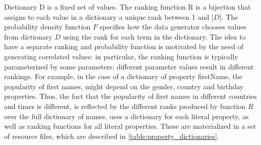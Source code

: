 Dictionary D is a fixed set of values. The ranking function R is a bijection
that assigns to each value in a dictionary a unique rank between 1 and |$D$|.
The probability density function $F$ specifies how the data generator chooses
values from dictionary $D$ using the rank for each term in the dictionary. The
idea to have a separate ranking and probability function is motivated by the
need of generating correlated values: in particular, the ranking function is
typically parameterized by some parameters: different parameter values result
in different rankings. For example, in the case of a dictionary of property
firstName, the popularity of first names, might depend on the gender, country
and birthday properties. Thus, the fact that the popularity of first names in
different countries and times is different, is reflected by the different ranks
produced by function $R$ over the full dictionary of names.  \datagen uses a
dictionary for each literal property, as well as ranking functions for all
literal properties. These are materialized in a set of resource files, which
are described in \autoref{table:property_dictionaries}.

